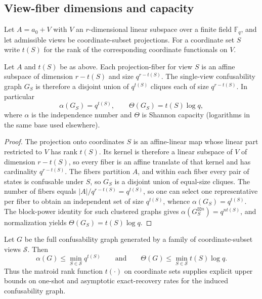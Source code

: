 \subsection{View-fiber dimensions and capacity}
\label{sec:affine-to-graph}

Let $A=a_0+V$ with $V$ an $r$-dimensional linear subspace over a finite field $\mathbb{F}_q$, and let admissible views be coordinate-subset projections. For a coordinate set $S$ write $t(S)$ for the rank of the corresponding coordinate functionals on $V$.

\begin{proposition}
Let $A$ and $t(S)$ be as above. Each projection-fiber for view $S$ is an affine subspace of dimension $r-t(S)$ and size $q^{r-t(S)}$. The single-view confusability graph $G_S$ is therefore a disjoint union of $q^{t(S)}$ cliques each of size $q^{r-t(S)}$. In particular
\[
\alpha(G_S)=q^{t(S)},\qquad \Theta(G_S)=t(S)\log q,
\]
where $\alpha$ is the independence number and $\Theta$ is Shannon capacity (logarithms in the same base used elsewhere).
\end{proposition}

\begin{proof}
The projection onto coordinates $S$ is an affine-linear map whose linear part restricted to $V$ has rank $t(S)$. Its kernel is therefore a linear subspace of $V$ of dimension $r-t(S)$, so every fiber is an affine translate of that kernel and has cardinality $q^{r-t(S)}$. The fibers partition $A$, and within each fiber every pair of states is confusable under $S$, so $G_S$ is a disjoint union of equal-size cliques. The number of fibers equals $|A|/q^{r-t(S)}=q^{t(S)}$, so one can select one representative per fiber to obtain an independent set of size $q^{t(S)}$, whence $\alpha(G_S)=q^{t(S)}$. The block-power identity for such clustered graphs gives $\alpha(G_S^{\boxtimes n})=q^{nt(S)}$, and normalization yields $\Theta(G_S)=t(S)\log q$.
\end{proof}

\begin{corollary}\label{cor:matroid-capacity-bounds}
Let $G$ be the full confusability graph generated by a family of coordinate-subset views $\mathcal S$. Then
\[
\alpha(G)\le \min_{S\in\mathcal S} q^{t(S)}
\qquad\text{and}\qquad
\Theta(G) \le \min_{S\in\mathcal S} t(S)\log q.
\]
Thus the matroid rank function $t(\cdot)$ on coordinate sets supplies explicit upper bounds on one-shot and asymptotic exact-recovery rates for the induced confusability graph.
\end{corollary}

